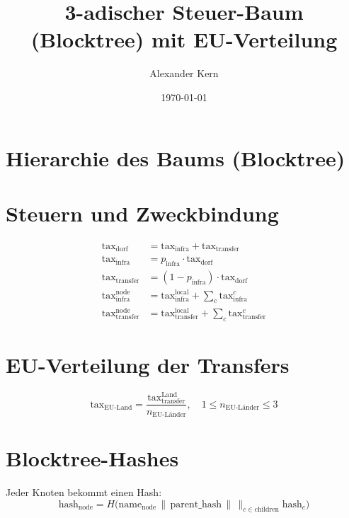 \documentclass[a4paper,12pt]{article}
\title{3-adischer Steuer-Baum (Blocktree) mit EU-Verteilung}
\author{Alexander Kern}
\date{\today}
\begin{document}
\maketitle

\section{Hierarchie des Baums (Blocktree)}
\begin{center}
\end{center}

\section{Steuern und Zweckbindung}
\begin{align*}
\text{tax}_\text{dorf} &= \text{tax}_\text{infra} + \text{tax}_\text{transfer} \\
\text{tax}_\text{infra} &= p_\text{infra} \cdot \text{tax}_\text{dorf} \\
\text{tax}_\text{transfer} &= (1 - p_\text{infra}) \cdot \text{tax}_\text{dorf} \\
\text{tax}_\text{infra}^{\text{node}} &= \text{tax}_\text{infra}^{\text{local}} + \sum_{c} \text{tax}_\text{infra}^c \\
\text{tax}_\text{transfer}^{\text{node}} &= \text{tax}_\text{transfer}^{\text{local}} + \sum_{c} \text{tax}_\text{transfer}^c
\end{align*}

\section{EU-Verteilung der Transfers}
\[
\text{tax}_\text{EU-Land} = \frac{\text{tax}_\text{transfer}^{\text{Land}}}{n_\text{EU-Länder}}, \quad 1 \le n_\text{EU-Länder} \le 3
\]

\section{Blocktree-Hashes}
Jeder Knoten bekommt einen Hash:
\[
\text{hash}_\text{node} = H\Big(\text{name}_\text{node} \,\|\, \text{parent\_hash} \,\|\, \big\|_{c \in \text{children}} \text{hash}_c \Big)
\]
\end{document}
